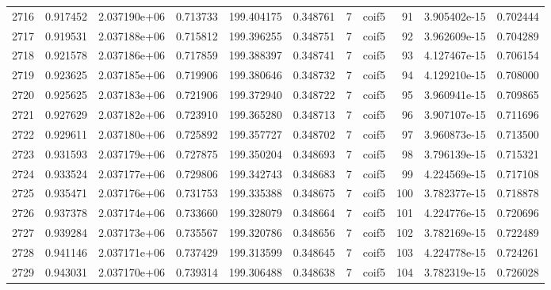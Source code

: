 \begin{tabular}{lrrrrrrlrrr}
2716 &    0.917452 &        2.037190e+06 &  0.713733 &              199.404175 &    0.348761 &       7 &        coif5 &     91 &   3.905402e-15 &      0.702444 \\
2717 &    0.919531 &        2.037188e+06 &  0.715812 &              199.396255 &    0.348751 &       7 &        coif5 &     92 &   3.962609e-15 &      0.704289 \\
2718 &    0.921578 &        2.037186e+06 &  0.717859 &              199.388397 &    0.348741 &       7 &        coif5 &     93 &   4.127467e-15 &      0.706154 \\
2719 &    0.923625 &        2.037185e+06 &  0.719906 &              199.380646 &    0.348732 &       7 &        coif5 &     94 &   4.129210e-15 &      0.708000 \\
2720 &    0.925625 &        2.037183e+06 &  0.721906 &              199.372940 &    0.348722 &       7 &        coif5 &     95 &   3.960941e-15 &      0.709865 \\
2721 &    0.927629 &        2.037182e+06 &  0.723910 &              199.365280 &    0.348713 &       7 &        coif5 &     96 &   3.907107e-15 &      0.711696 \\
2722 &    0.929611 &        2.037180e+06 &  0.725892 &              199.357727 &    0.348702 &       7 &        coif5 &     97 &   3.960873e-15 &      0.713500 \\
2723 &    0.931593 &        2.037179e+06 &  0.727875 &              199.350204 &    0.348693 &       7 &        coif5 &     98 &   3.796139e-15 &      0.715321 \\
2724 &    0.933524 &        2.037177e+06 &  0.729806 &              199.342743 &    0.348683 &       7 &        coif5 &     99 &   4.224569e-15 &      0.717108 \\
2725 &    0.935471 &        2.037176e+06 &  0.731753 &              199.335388 &    0.348675 &       7 &        coif5 &    100 &   3.782377e-15 &      0.718878 \\
2726 &    0.937378 &        2.037174e+06 &  0.733660 &              199.328079 &    0.348664 &       7 &        coif5 &    101 &   4.224776e-15 &      0.720696 \\
2727 &    0.939284 &        2.037173e+06 &  0.735567 &              199.320786 &    0.348656 &       7 &        coif5 &    102 &   3.782169e-15 &      0.722489 \\
2728 &    0.941146 &        2.037171e+06 &  0.737429 &              199.313599 &    0.348645 &       7 &        coif5 &    103 &   4.224778e-15 &      0.724261 \\
2729 &    0.943031 &        2.037170e+06 &  0.739314 &              199.306488 &    0.348638 &       7 &        coif5 &    104 &   3.782319e-15 &      0.726028 \\
\bottomrule
\end{tabular}
